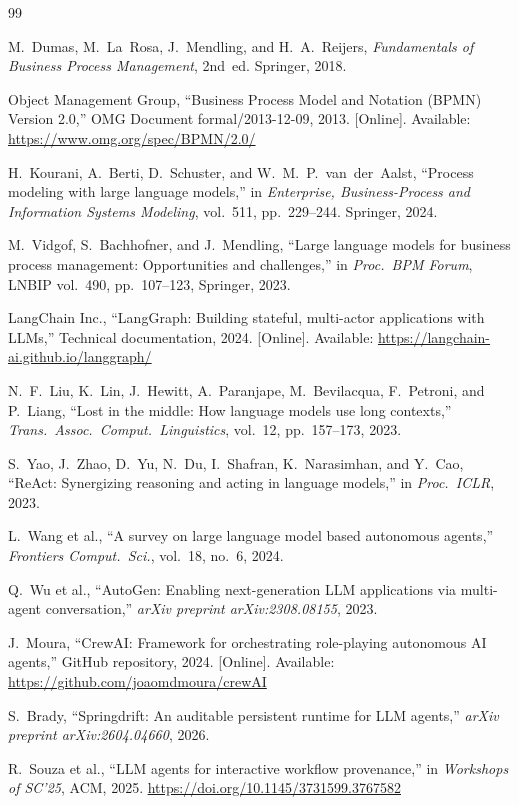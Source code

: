 \documentclass[10pt,conference]{IEEEtran}
\begin{document}

\begin{thebibliography}{99}

M.~Dumas, M.~La~Rosa, J.~Mendling, and H.~A.~Reijers,
\textit{Fundamentals of Business Process Management}, 2nd~ed.
Springer, 2018.

Object Management Group,
``Business Process Model and Notation (BPMN) Version 2.0,''
OMG Document formal/2013-12-09, 2013. [Online]. Available:
\url{https://www.omg.org/spec/BPMN/2.0/}

H.~Kourani, A.~Berti, D.~Schuster, and W.~M.~P.~van~der~Aalst,
``Process modeling with large language models,''
in \textit{Enterprise, Business-Process and Information Systems
Modeling}, vol.~511, pp.~229--244. Springer, 2024.

M.~Vidgof, S.~Bachhofner, and J.~Mendling,
``Large language models for business process management:
Opportunities and challenges,''
in \textit{Proc.\ BPM Forum}, LNBIP vol.~490,
pp.~107--123, Springer, 2023.

LangChain Inc.,
``LangGraph: Building stateful, multi-actor applications
with LLMs,'' Technical documentation, 2024. [Online]. Available:
\url{https://langchain-ai.github.io/langgraph/}

N.~F.~Liu, K.~Lin, J.~Hewitt, A.~Paranjape, M.~Bevilacqua,
F.~Petroni, and P.~Liang,
``Lost in the middle: How language models use long contexts,''
\textit{Trans.\ Assoc.\ Comput.\ Linguistics}, vol.~12,
pp.~157--173, 2023.

S.~Yao, J.~Zhao, D.~Yu, N.~Du, I.~Shafran, K.~Narasimhan,
and Y.~Cao,
``ReAct: Synergizing reasoning and acting in language models,''
in \textit{Proc.\ ICLR}, 2023.

L.~Wang et al.,
``A survey on large language model based autonomous agents,''
\textit{Frontiers Comput.\ Sci.}, vol.~18, no.~6, 2024.

Q.~Wu et al.,
``AutoGen: Enabling next-generation LLM applications via
multi-agent conversation,''
\textit{arXiv preprint arXiv:2308.08155}, 2023.

J.~Moura,
``CrewAI: Framework for orchestrating role-playing autonomous
AI agents,'' GitHub repository, 2024. [Online]. Available:
\url{https://github.com/joaomdmoura/crewAI}

S.~Brady,
``Springdrift: An auditable persistent runtime for LLM agents,''
\textit{arXiv preprint arXiv:2604.04660}, 2026.

R.~Souza et al.,
``LLM agents for interactive workflow provenance,''
in \textit{Workshops of SC'25}, ACM, 2025.
\url{https://doi.org/10.1145/3731599.3767582}

\end{thebibliography}
\end{document}
